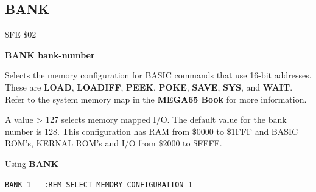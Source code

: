 
\newpage
\subsection{BANK}
\begin{description}[leftmargin=2cm,style=nextline]
\item [Token:] \$FE \$02
\item [Format:] {\bf BANK bank-number}
\item [Usage:] Selects the memory configuration
               for BASIC commands that use 16-bit addresses.
               These are {\bf LOAD}, {\bf LOADIFF}, {\bf PEEK}, {\bf POKE}, {\bf SAVE}, {\bf SYS}, and {\bf WAIT}.
               Refer to the system memory map in
\ifdefined\printmanual
the {\bf MEGA65 Book}
\else
\fi
for more information.
\item [Remarks:] A value > 127 selects memory mapped I/O.
                 The default value for the bank number is 128.
                 This configuration has RAM from \$0000 to \$1FFF
                 and BASIC ROM's, KERNAL ROM's and I/O from \$2000 to \$FFFF.
\item [Example:] Using {\bf BANK}
\begin{tcolorbox}[colback=black,coltext=white]
\verbatimfont{\codefont}
\begin{verbatim}
BANK 1   :REM SELECT MEMORY CONFIGURATION 1
\end{verbatim}
\end{tcolorbox}
\end{description}


\newpage
